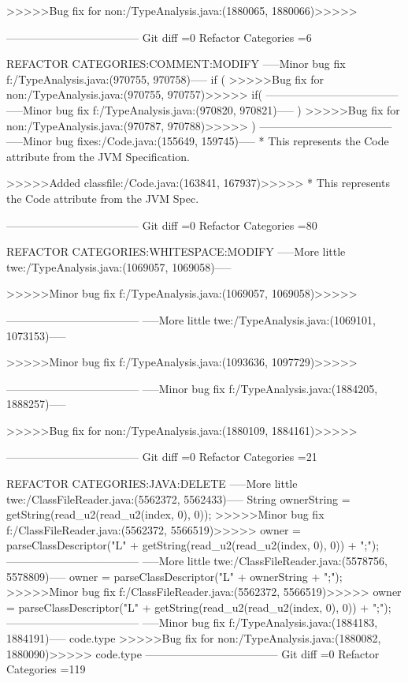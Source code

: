 >>>>>Bug fix for non:/TypeAnalysis.java:(1880065, 1880066)>>>>>
		
------------------------------------
Git diff =0  Refactor Categories =6

REFACTOR CATEGORIES:COMMENT:MODIFY
-----Minor bug fix f:/TypeAnalysis.java:(970755, 970758)-----
if (
>>>>>Bug fix for non:/TypeAnalysis.java:(970755, 970757)>>>>>
if(
------------------------------------
-----Minor bug fix f:/TypeAnalysis.java:(970820, 970821)-----
) 
>>>>>Bug fix for non:/TypeAnalysis.java:(970787, 970788)>>>>>
) 
------------------------------------
-----Minor bug fixes:/Code.java:(155649, 159745)-----
 * This represents the Code attribute from the JVM Specification.
 
>>>>>Added classfile:/Code.java:(163841, 167937)>>>>>
 * This represents the Code attribute from the JVM Spec.
 
------------------------------------
Git diff =0  Refactor Categories =80

REFACTOR CATEGORIES:WHITESPACE:MODIFY
-----More little twe:/TypeAnalysis.java:(1069057, 1069058)-----
		
>>>>>Minor bug fix f:/TypeAnalysis.java:(1069057, 1069058)>>>>>
		
------------------------------------
-----More little twe:/TypeAnalysis.java:(1069101, 1073153)-----
		
	
>>>>>Minor bug fix f:/TypeAnalysis.java:(1093636, 1097729)>>>>>

	
------------------------------------
-----Minor bug fix f:/TypeAnalysis.java:(1884205, 1888257)-----

	
>>>>>Bug fix for non:/TypeAnalysis.java:(1880109, 1884161)>>>>>

	
------------------------------------
Git diff =0  Refactor Categories =21

REFACTOR CATEGORIES:JAVA:DELETE
-----More little twe:/ClassFileReader.java:(5562372, 5562433)-----
String ownerString = getString(read_u2(read_u2(index, 0), 0));
>>>>>Minor bug fix f:/ClassFileReader.java:(5562372, 5566519)>>>>>
owner = parseClassDescriptor("L"
					+ getString(read_u2(read_u2(index, 0), 0)) + ";");
------------------------------------
-----More little twe:/ClassFileReader.java:(5578756, 5578809)-----
owner = parseClassDescriptor("L" + ownerString + ";");
>>>>>Minor bug fix f:/ClassFileReader.java:(5562372, 5566519)>>>>>
owner = parseClassDescriptor("L"
					+ getString(read_u2(read_u2(index, 0), 0)) + ";");
------------------------------------
-----Minor bug fix f:/TypeAnalysis.java:(1884183, 1884191)-----
code.type
>>>>>Bug fix for non:/TypeAnalysis.java:(1880082, 1880090)>>>>>
code.type
------------------------------------
Git diff =0  Refactor Categories =119

